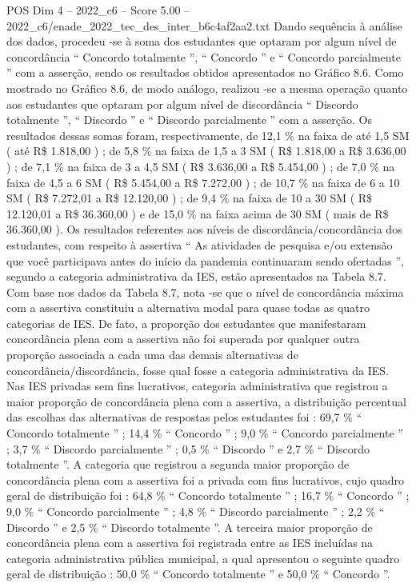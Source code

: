\begin{textsample}{POS Dim 4 – 2022\_c6 – Score 5.00 – 2022\_c6/enade\_2022\_tec\_des\_inter\_b6c4af2aa2.txt}
Dando sequência à análise dos dados, procedeu -se à soma dos estudantes que optaram por algum nível de concordância “ Concordo totalmente ”, “ Concordo ” e “ Concordo parcialmente ” com a asserção, sendo os resultados obtidos apresentados no Gráfico 8.6.
Como mostrado no Gráfico 8.6, de modo análogo, realizou -se a mesma operação quanto aos estudantes que optaram por algum nível de discordância “ Discordo totalmente ”, “ Discordo ” e “ Discordo parcialmente ” com a asserção.
Os resultados dessas somas foram, respectivamente, de 12,1 \% na faixa de até 1,5 SM ( até R\$ 1.818,00 ) ; de 5,8 \% na faixa de 1,5 a 3 SM ( R\$ 1.818,00 a R\$ 3.636,00 ) ; de 7,1 \% na faixa de 3 a 4,5 SM ( R\$ 3.636,00 a R\$ 5.454,00 ) ; de 7,0 \% na faixa de 4,5 a 6 SM ( R\$ 5.454,00 a R\$ 7.272,00 ) ; de 10,7 \% na faixa de 6 a 10 SM ( R\$ 7.272,01 a R\$ 12.120,00 ) ; de 9,4 \% na faixa de 10 a 30 SM ( R\$ 12.120,01 a R\$ 36.360,00 ) e de 15,0 \% na faixa acima de 30 SM ( mais de R\$ 36.360,00 ).
Os resultados referentes aos níveis de discordância/concordância dos estudantes, com respeito à assertiva “ As atividades de pesquisa e/ou extensão que você participava antes do início da pandemia continuaram sendo ofertadas ”, segundo a categoria administrativa da IES, estão apresentados na Tabela 8.7.
Com base nos dados da Tabela 8.7, nota -se que o nível de concordância máxima com a assertiva constituiu a alternativa modal para quase todas as quatro categorias de IES.
De fato, a proporção dos estudantes que manifestaram concordância plena com a assertiva não foi superada por qualquer outra proporção associada a cada uma das demais alternativas de concordância/discordância, fosse qual fosse a categoria administrativa da IES.
Nas IES privadas sem fins lucrativos, categoria administrativa que registrou a maior proporção de concordância plena com a assertiva, a distribuição percentual das escolhas das alternativas de respostas pelos estudantes foi : 69,7 \% “ Concordo totalmente ” ; 14,4 \% “ Concordo ” ; 9,0 \% “ Concordo parcialmente ” ; 3,7 \% “ Discordo parcialmente ” ; 0,5 \% “ Discordo ” e 2,7 \% “ Discordo totalmente ”.
A categoria que registrou a segunda maior proporção de concordância plena com a assertiva foi a privada com fins lucrativos, cujo quadro geral de distribuição foi : 64,8 \% “ Concordo totalmente ” ; 16,7 \% “ Concordo ” ; 9,0 \% “ Concordo parcialmente ” ; 4,8 \% “ Discordo parcialmente ” ; 2,2 \% “ Discordo ” e 2,5 \% “ Discordo totalmente ”.
A terceira maior proporção de concordância plena com a assertiva foi registrada entre as IES incluídas na categoria administrativa pública municipal, a qual apresentou o seguinte quadro geral de distribuição : 50,0 \% “ Concordo totalmente ” e 50,0 \% “ Concordo ”.

\end{textsample}

